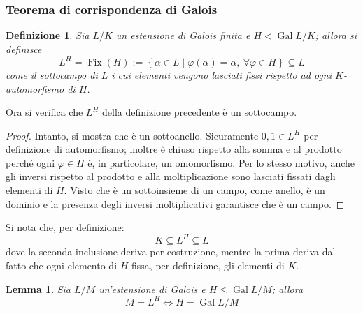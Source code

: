 \documentclass[12pt]{scrartcl}
\theoremstyle{style}
\newtheorem{definizione}{Definizione}[section]
\newtheorem{lemma}{Lemma}[teorema]
\numberwithin{equation}{subsection}
\begin{document}
\subsubsection{Teorema di corrispondenza di Galois}
\begin{definizione}
	Sia $L / K$ un estensione di Galois finita e $H < \operatorname{Gal} L / K$; allora si definisce
	\[
	L^H = \operatorname{Fix} (H) := \left\{ \alpha \in L \mid \varphi (\alpha ) = \alpha  , \ \forall \varphi \in H \right\} \subseteq L
	\] 
	come il sottocampo di $L$ i cui elementi vengono lasciati fissi rispetto ad ogni $K$-automorfismo di $H$.
\end{definizione}
\noindent Ora si verifica che $L^H$ della definizione precedente \`e un sottocampo.
\begin{proof}
	Intanto, si mostra che \`e un sottoanello. 
	Sicuramente $0,1 \in L^H$ per definizione di automorfismo; inoltre \`e chiuso rispetto alla somma e al prodotto perch\'e ogni $\varphi \in H$ \`e, in particolare, un omomorfismo.
	Per lo stesso motivo, anche gli inversi rispetto al prodotto e alla moltiplicazione sono lasciati fissati dagli elementi di $H$.
	Visto che \`e un sottoinsieme di un campo, come anello, \`e un dominio e la presenza degli inversi moltiplicativi garantisce che \`e un campo.
\end{proof}
\noindent Si nota che, per definizione:
\begin{equation}
	K\subseteq L^H \subseteq L
\end{equation}
dove la seconda inclusione deriva per costruzione, mentre la prima deriva dal fatto che ogni elemento di $H$ fissa, per definizione, gli elementi di $K$.
\begin{lemma}\label{lcg1}
	Sia $L / M$ un'estensione di Galois e $H \le \operatorname{Gal} L / M$; allora
	\[
	M = L^H \iff H = \operatorname{Gal} L / M
	\] 
\end{lemma}
\end{document}
